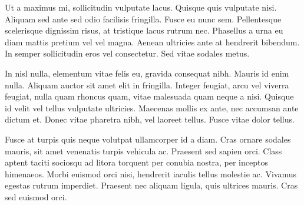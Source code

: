 Ut a maximus mi, sollicitudin vulputate lacus. Quisque quis vulputate nisi. Aliquam sed ante sed odio facilisis fringilla. Fusce eu nunc sem. Pellentesque scelerisque dignissim risus, at tristique lacus rutrum nec. Phasellus a urna eu diam mattis pretium vel vel magna. Aenean ultricies ante at hendrerit bibendum. In semper sollicitudin eros vel consectetur. Sed vitae sodales metus.

In nisl nulla, elementum vitae felis eu, gravida consequat nibh. Mauris id enim nulla. Aliquam auctor sit amet elit in fringilla. Integer feugiat, arcu vel viverra feugiat, nulla quam rhoncus quam, vitae malesuada quam neque a nisi. Quisque id velit vel tellus vulputate ultricies. Maecenas mollis ex ante, nec accumsan ante dictum et. Donec vitae pharetra nibh, vel laoreet tellus. Fusce vitae dolor tellus.

Fusce at turpis quis neque volutpat ullamcorper id a diam. Cras ornare sodales mauris, sit amet venenatis turpis vehicula ac. Praesent sed sapien orci. Class aptent taciti sociosqu ad litora torquent per conubia nostra, per inceptos himenaeos. Morbi euismod orci nisi, hendrerit iaculis tellus molestie ac. Vivamus egestas rutrum imperdiet. Praesent nec aliquam ligula, quis ultrices mauris. Cras sed euismod orci.
